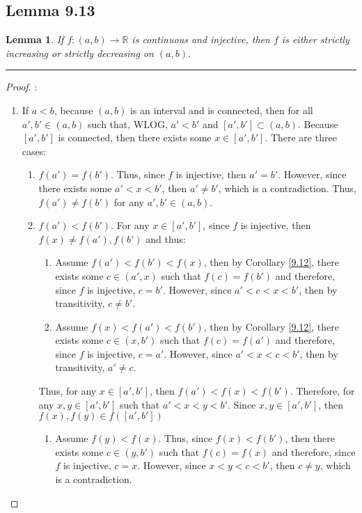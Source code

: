 \documentclass[openany, amssymb, psamsfonts]{amsart}
\newcommand{\bbR}{\mathbb{R}}
\newtheorem{lem}{Lemma}[section]
\theoremstyle{definition}
\numberwithin{equation}{section}
\begin{document}
\subsection*{Lemma 9.13}
\begin{lem}
\label{9.13}
If $f:(a,b)\to\bbR$ is continuous and injective, then $f$ is either strictly increasing or strictly decreasing on $(a,b)$.
\end{lem}
\vspace{4pt}     \hrule   \vspace{4pt}\begin{proof}:\\
\begin{enumerate}
    \item If $a<b$, because $(a,b)$ is an interval and is connected, then for all $a',b' \in (a,b)$ such that, WLOG, $a'<b'$ and $[a',b']\subset (a,b)$. Because $[a',b']$ is connected, then there exists some $x\in [a',b']$. There are three cases:
    \begin{enumerate}
        \item $f(a') = f(b')$. Thus, since $f$ is injective, then $a' = b'$. However, since there exists some $a'<x<b'$, then $a'\neq b'$, which is a contradiction. Thus, $f(a') \neq f(b')$ for any $a',b' \in (a,b)$.
        \item $f(a') < f(b')$. For any $x\in [a',b']$, since $f$ is injective, then $f(x) \neq f(a'), f(b')$ and thus:
        \begin{enumerate}
            \item Assume $f(a')<f(b')<f(x)$, then by Corollary \ref{9.12}, there exists some $c\in (a',x)$ such that $f(c) = f(b')$ and therefore, since $f$ is injective, $c=b'$. However, since $a'<c<x<b'$, then by transitivity, $c\neq b'$. 
            \item Assume $f(x) < f(a') < f(b')$, then by Corollary \ref{9.12}, there exists some $c\in (x,b')$ such that $f(c) = f(a')$ and therefore, since $f$ is injective, $c= a'$. However, since $a'<x<c<b'$, then by transitivity, $a'\neq c$. 
        \end{enumerate}
        Thus, for any $x\in [a',b']$, then $f(a')<f(x)<f(b')$. Therefore, for any $x,y \in [a',b']$ such that $a'< x<y < b'$. Since $x,y \in [a',b']$, then $f(x),f(y) \in f([a',b'])$
        \begin{enumerate}
            \item Assume $f(y)<f(x)$. Thus, since $f(x)<f(b')$, then there exists some $c\in (y,b')$ such that $f(c) = f(x)$ and therefore, since $f$ is injective, $c=x$. However, since $x<y<c<b'$, then $c\neq y$, which is a contradiction. 

\end{enumerate}
\end{enumerate}
\end{enumerate}
\end{proof}
\end{document}
